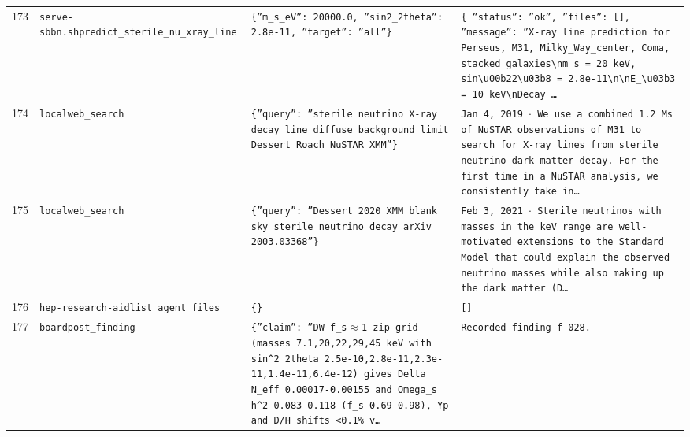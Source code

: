 \documentclass[11pt,a4paper]{article}
\begin{document}
\begin{longtable}{@{}p{}p{}p{}p{}@{}}
173 & \texttt{serve-sbbn.sh}\newline\texttt{predict\_\allowbreak{}sterile\_\allowbreak{}nu\_\allowbreak{}xray\_\allowbreak{}line} & \texttt{\{''m\_\allowbreak{}s\_\allowbreak{}eV'':\allowbreak{} 20000.0,\allowbreak{} ''sin2\_\allowbreak{}2theta'':\allowbreak{} 2.8e-11,\allowbreak{} ''target'':\allowbreak{} ''all''\}\allowbreak{}} & \texttt{\{   ''status'':\allowbreak{} ''ok'',\allowbreak{}   ''files'':\allowbreak{} []\allowbreak{},\allowbreak{}   ''message'':\allowbreak{} ''X-ray line prediction for Perseus,\allowbreak{} M31,\allowbreak{} Milky\_\allowbreak{}Way\_\allowbreak{}center,\allowbreak{} Coma,\allowbreak{} stacked\_\allowbreak{}galaxies\textbackslash{}\allowbreak{}nm\_\allowbreak{}s =\allowbreak{} 20 keV,\allowbreak{} sin\textbackslash{}\allowbreak{}u00b22\textbackslash{}\allowbreak{}u03b8 =\allowbreak{} 2.8e-11\textbackslash{}\allowbreak{}n\textbackslash{}\allowbreak{}nE\_\allowbreak{}\textbackslash{}\allowbreak{}u03b3 =\allowbreak{} 10 keV\textbackslash{}\allowbreak{}nDecay \ldots{}\allowbreak{}} \\
174 & \texttt{local}\newline\texttt{web\_\allowbreak{}search} & \texttt{\{''query'':\allowbreak{} ''sterile neutrino X-ray decay line diffuse background limit Dessert Roach NuSTAR XMM''\}\allowbreak{}} & \texttt{Jan 4,\allowbreak{} 2019 $\cdot$ We use a combined 1.2 Ms of NuSTAR observations of M31 to search for X-ray lines from sterile neutrino dark matter decay. For the first time in a NuSTAR analysis,\allowbreak{} we consistently take in\ldots{}\allowbreak{}} \\
175 & \texttt{local}\newline\texttt{web\_\allowbreak{}search} & \texttt{\{''query'':\allowbreak{} ''Dessert 2020 XMM blank sky sterile neutrino decay arXiv 2003.03368''\}\allowbreak{}} & \texttt{Feb 3,\allowbreak{} 2021 $\cdot$ Sterile neutrinos with masses in the keV range are well-motivated extensions to the Standard Model that could explain the observed neutrino masses while also making up the dark matter (D\ldots{}\allowbreak{}} \\
176 & \texttt{hep-research-aid}\newline\texttt{list\_\allowbreak{}agent\_\allowbreak{}files} & \texttt{\{\}\allowbreak{}} & \texttt{[]\allowbreak{}} \\
177 & \texttt{board}\newline\texttt{post\_\allowbreak{}finding} & \texttt{\{''claim'':\allowbreak{} ''DW f\_\allowbreak{}s$\approx$1 zip grid (masses 7.1,\allowbreak{}20,\allowbreak{}22,\allowbreak{}29,\allowbreak{}45 keV with sin\textasciicircum{}\allowbreak{}2 2theta 2.5e-10,\allowbreak{}2.8e-11,\allowbreak{}2.3e-11,\allowbreak{}1.4e-11,\allowbreak{}6.4e-12)\allowbreak{} gives Delta N\_\allowbreak{}eff 0.00017-0.00155 and Omega\_\allowbreak{}s h\textasciicircum{}\allowbreak{}2 0.083-0.118 (f\_\allowbreak{}s 0.69-0.98)\allowbreak{},\allowbreak{} Yp and D/\allowbreak{}H shifts \textless{}\allowbreak{}0.1\% v\ldots{}\allowbreak{}} & \texttt{Recorded finding f-028.} \\

\end{longtable}
\end{document}
